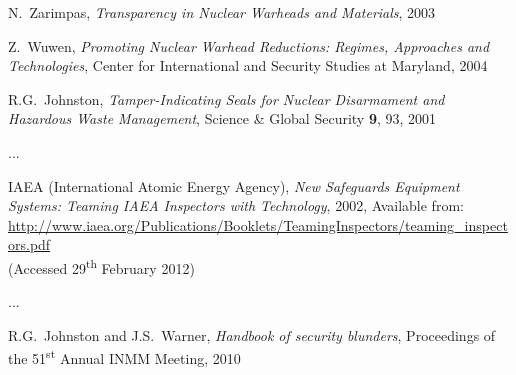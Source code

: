 \documentclass[twocolumn,a4paper]{article}
\begin{document}
\begin{thebibliography}{9}
{}
  N.~Zarimpas, \emph{Transparency in Nuclear
  Warheads and Materials}, 2003

  Z.~Wuwen, \emph{Promoting Nuclear Warhead
  Reductions: Regimes, Approaches and Technologies}, Center for
  International and Security Studies at Maryland, 2004

  R.G.~Johnston,
  \emph{Tamper-Indicating Seals for Nuclear Disarmament and Hazardous
    Waste Management}, Science \& Global Security \textbf{9}, 93, 2001

...

  IAEA (International Atomic Energy Agency), \emph{New Safeguards
  Equipment Systems: Teaming IAEA Inspectors with Technology}, 2002,
  Available from: \\
  \url{http://www.iaea.org/Publications/Booklets/TeamingInspectors/teaming_inspectors.pdf}\\
  (Accessed 29\textsuperscript{th} February 2012)

...

  R.G.~Johnston and J.S.~Warner,
  \emph{Handbook of security blunders}, Proceedings of the
  51\textsuperscript{st} Annual INMM Meeting, 2010

\end{thebibliography}
\end{document}
